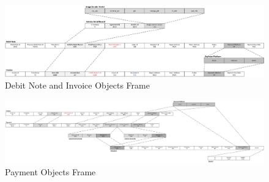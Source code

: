 \begin{figure}[H]
    \centering
    \includegraphics[width=17cm,angle=0]{./diag/Reference/PaymentFrame-1-Reference.png}
	\caption{Debit Note and Invoice Objects Frame}
    \label{fig:PF1}
\end{figure}

\begin{figure}[H]
    \centering
    \includegraphics[width=19cm,angle=0]{./diag/Reference/PaymentFrame-2-Reference.png}
	\caption{Payment Objects Frame}
    \label{fig:PF2}
\end{figure}

